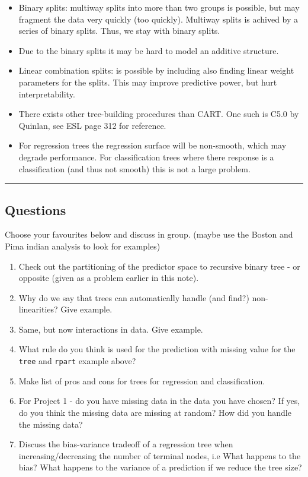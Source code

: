 \documentclass[
  letterpaper,
  DIV=11,
  numbers=noendperiod]{scrartcl}
\providecommand{\tightlist}{%
  \setlength{\itemsep}{0pt}\setlength{\parskip}{0pt}}\usepackage{longtable,booktabs,array}
\begin{document}
\begin{itemize}
\tightlist
\item
  Binary splits: multiway splits into more than two groups is possible,
  but may fragment the data very quickly (too quickly). Multiway splits
  is achived by a series of binary splits. Thus, we stay with binary
  splits.
\item
  Due to the binary splits it may be hard to model an additive
  structure.
\item
  Linear combination splits: is possible by including also finding
  linear weight parameters for the splits. This may improve predictive
  power, but hurt interpretability.
\item
  There exists other tree-building procedures than CART. One such is
  C5.0 by Quinlan, see ESL page 312 for reference.
\item
  For regression trees the regression surface will be non-smooth, which
  may degrade performance. For classification trees where there response
  is a classification (and thus not smooth) this is not a large problem.
\end{itemize}

\begin{center}\rule{0.5\linewidth}{0.5pt}\end{center}

\hypertarget{questions}{%
\subsection{Questions}\label{questions}}

Choose your favourites below and discuss in group. (maybe use the Boston
and Pima indian analysis to look for examples)

\begin{enumerate}
\def\labelenumi{\arabic{enumi})}
\tightlist
\item
  Check out the partitioning of the predictor space to recursive binary
  tree - or opposite (given as a problem earlier in this note).
\item
  Why do we say that trees can automatically handle (and find?)
  non-linearities? Give example.
\item
  Same, but now interactions in data. Give example.
\item
  What rule do you think is used for the prediction with missing value
  for the \texttt{tree} and \texttt{rpart} example above?
\item
  Make list of pros and cons for trees for regression and
  classification.
\item
  For Project 1 - do you have missing data in the data you have chosen?
  If yes, do you think the missing data are missing at random? How did
  you handle the missing data?
\item
  Discuss the bias-variance tradeoff of a regression tree when
  increasing/decreasing the number of terminal nodes, i.e What happens
  to the bias? What happens to the variance of a prediction if we reduce
  the tree size?
\end{enumerate}
\end{document}
